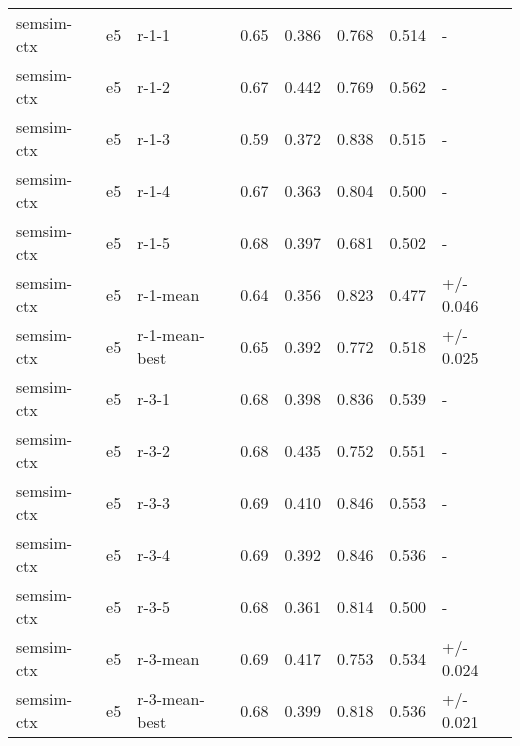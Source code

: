 \begin{tabular}{llllll}
\toprule
\midrule
semsim-ctx & e5 & r-1-1 & 0.65 & 0.386 & 0.768 & 0.514 & - \\
semsim-ctx & e5 & r-1-2 & 0.67 & 0.442 & 0.769 & 0.562 & - \\
semsim-ctx & e5 & r-1-3 & 0.59 & 0.372 & 0.838 & 0.515 & - \\
semsim-ctx & e5 & r-1-4 & 0.67 & 0.363 & 0.804 & 0.500 & - \\
semsim-ctx & e5 & r-1-5 & 0.68 & 0.397 & 0.681 & 0.502 & - \\
semsim-ctx & e5 & r-1-mean & 0.64 & 0.356 & 0.823 & 0.477 & +/- 0.046 \\
semsim-ctx & e5 & r-1-mean-best & 0.65 & 0.392 & 0.772 & 0.518 & +/- 0.025 \\
semsim-ctx & e5 & r-3-1 & 0.68 & 0.398 & 0.836 & 0.539 & - \\
semsim-ctx & e5 & r-3-2 & 0.68 & 0.435 & 0.752 & 0.551 & - \\
semsim-ctx & e5 & r-3-3 & 0.69 & 0.410 & 0.846 & 0.553 & - \\
semsim-ctx & e5 & r-3-4 & 0.69 & 0.392 & 0.846 & 0.536 & - \\
semsim-ctx & e5 & r-3-5 & 0.68 & 0.361 & 0.814 & 0.500 & - \\
semsim-ctx & e5 & r-3-mean & 0.69 & 0.417 & 0.753 & 0.534 & +/- 0.024 \\
semsim-ctx & e5 & r-3-mean-best & 0.68 & 0.399 & 0.818 & 0.536 & +/- 0.021 \\
\bottomrule
\end{tabular}
